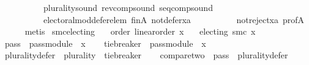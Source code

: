 \begin{isabellebody}
\ \ \ \ \ \ \ \ \ \ plurality{\isacharunderscore}{\kern0pt}sound\ rev{\isacharunderscore}{\kern0pt}comp{\isacharunderscore}{\kern0pt}sound\ seq{\isacharunderscore}{\kern0pt}comp{\isacharunderscore}{\kern0pt}sound\isanewline
\ \ \ \ \ \ \ \ \ \ electoral{\isacharunderscore}{\kern0pt}mod{\isacharunderscore}{\kern0pt}defer{\isacharunderscore}{\kern0pt}elem\ fin{\isacharunderscore}{\kern0pt}A\ not{\isacharunderscore}{\kern0pt}defer{\isacharunderscore}{\kern0pt}xa\isanewline
\ \ \ \ \ \ \ \ \ \ not{\isacharunderscore}{\kern0pt}reject{\isacharunderscore}{\kern0pt}xa\ prof{\isacharunderscore}{\kern0pt}A\isanewline
\ \ \ \ \isamarkupfalse%
\ metis\isanewline
{}\isamarkupfalse%
%
\endisatagproof
{\isafoldproof}%
%
\isadelimproof
%
\endisadelimproof
%
\isadelimdocument
%
\endisadelimdocument
%
\isatagdocument
%
\isamarkuptrue%
%
\endisatagdocument
{\isafolddocument}%
%
\isadelimdocument
%
\endisadelimdocument
{}\isamarkupfalse%
\ smc{\isacharunderscore}{\kern0pt}electing{\isacharcolon}{\kern0pt}\isanewline
\ \ \ order{\isacharcolon}{\kern0pt}\ {\isachardoublequoteopen}linear{\isacharunderscore}{\kern0pt}order\ x{\isachardoublequoteclose}\isanewline
\ \ \ {\isachardoublequoteopen}electing\ {\isacharparenleft}{\kern0pt}smc\ x{\isacharparenright}{\kern0pt}{\isachardoublequoteclose}\isanewline
%
\isadelimproof
%
\endisadelimproof
%
\isatagproof
{}\isamarkupfalse%
\ {\isacharminus}{\kern0pt}\isanewline
\ \ \isamarkupfalse%
\ {\isacharquery}{\kern0pt}pass{}\ {\isacharequal}{\kern0pt}\ {\isachardoublequoteopen}pass{\isacharunderscore}{\kern0pt}module\ {}\ x{\isachardoublequoteclose}\isanewline
\ \ \isamarkupfalse%
\ {\isacharquery}{\kern0pt}tie{\isacharunderscore}{\kern0pt}breaker\ {\isacharequal}{\kern0pt}\ {\isachardoublequoteopen}{\isacharparenleft}{\kern0pt}pass{\isacharunderscore}{\kern0pt}module\ {}\ x{\isacharparenright}{\kern0pt}{\isachardoublequoteclose}\isanewline
\ \ \isamarkupfalse%
\ {\isacharquery}{\kern0pt}plurality{\isacharunderscore}{\kern0pt}defer\ {\isacharequal}{\kern0pt}\ {\isachardoublequoteopen}{\isacharparenleft}{\kern0pt}plurality{\isasymdown}{\isacharparenright}{\kern0pt}\ {\isasymtriangleright}\ {\isacharquery}{\kern0pt}tie{\isacharunderscore}{\kern0pt}breaker{\isachardoublequoteclose}\isanewline
\ \ \isamarkupfalse%
\ {\isacharquery}{\kern0pt}compare{\isacharunderscore}{\kern0pt}two\ {\isacharequal}{\kern0pt}\ {\isachardoublequoteopen}{\isacharquery}{\kern0pt}pass{}\ {\isasymtriangleright}\ {\isacharquery}{\kern0pt}plurality{\isacharunderscore}{\kern0pt}defer{\isachardoublequoteclose}\isanewline

\end{isabellebody}
